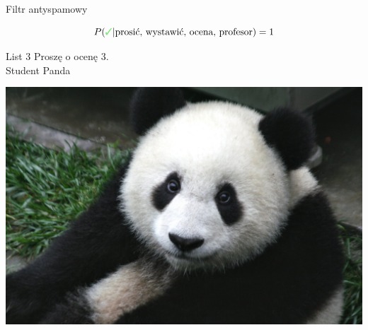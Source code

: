 \documentclass{mp}
\begin{document}
\begin{frame}{Filtr antyspamowy}
{\begin{minipage}{.45\textwidth}
\end{minipage}
\[ P(\cmark | \text{prosić, wystawić, ocena, profesor})=1 \]
}
{
	\begin{minipage}{.50\textwidth}
\begin{block}{List 3}
Proszę o ocenę 3.\\
Student Panda
\end{block}
\end{minipage}
\hfill
\begin{minipage}{.45\textwidth}
\includegraphics[width=\textwidth]{bayes/Panda_Cub_from_Wolong,_Sichuan,_China.JPG}\\
\end{minipage}

}
\end{frame}
\end{document}
